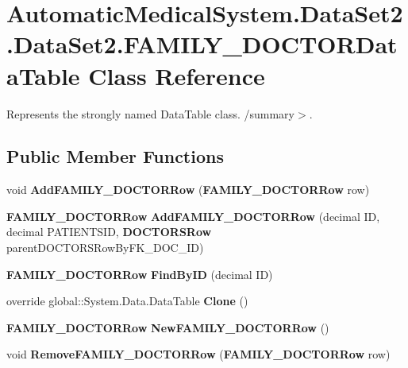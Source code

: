 \section{AutomaticMedicalSystem.DataSet2.DataSet2.FAMILY\_\-DOCTORDataTable Class Reference}
\label{class_automatic_medical_system_1_1_data_set2_1_1_f_a_m_i_l_y___d_o_c_t_o_r_data_table}
Represents the strongly named DataTable class. /summary$>$.  


\subsection*{Public Member Functions}
\begin{CompactItemize}
\item 
void \textbf{AddFAMILY\_\-DOCTORRow} ({\bf FAMILY\_\-DOCTORRow} row)\label{class_automatic_medical_system_1_1_data_set2_1_1_f_a_m_i_l_y___d_o_c_t_o_r_data_table_ceac22aab1388dbc83f4d0aba5397e2d}

\item 
{\bf FAMILY\_\-DOCTORRow} \textbf{AddFAMILY\_\-DOCTORRow} (decimal ID, decimal PATIENTSID, {\bf DOCTORSRow} parentDOCTORSRowByFK\_\-DOC\_\-ID)\label{class_automatic_medical_system_1_1_data_set2_1_1_f_a_m_i_l_y___d_o_c_t_o_r_data_table_a6860a3bc76dc174518de130de5ae078}

\item 
{\bf FAMILY\_\-DOCTORRow} \textbf{FindByID} (decimal ID)\label{class_automatic_medical_system_1_1_data_set2_1_1_f_a_m_i_l_y___d_o_c_t_o_r_data_table_8662b90af0e091910ef740eb4790492d}

\item 
override global::System.Data.DataTable \textbf{Clone} ()\label{class_automatic_medical_system_1_1_data_set2_1_1_f_a_m_i_l_y___d_o_c_t_o_r_data_table_74779d1b4b56f11a58fda3e09214862d}

\item 
{\bf FAMILY\_\-DOCTORRow} \textbf{NewFAMILY\_\-DOCTORRow} ()\label{class_automatic_medical_system_1_1_data_set2_1_1_f_a_m_i_l_y___d_o_c_t_o_r_data_table_a7e5c8b00ed1a2c719d9b847e2f55db7}

\item 
void \textbf{RemoveFAMILY\_\-DOCTORRow} ({\bf FAMILY\_\-DOCTORRow} row)\label{class_automatic_medical_system_1_1_data_set2_1_1_f_a_m_i_l_y___d_o_c_t_o_r_data_table_1ffafb15fad230c35f7aa077e320bab9}

\end{CompactItemize}
